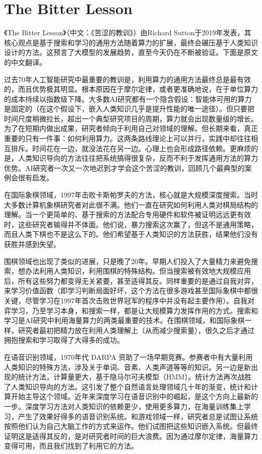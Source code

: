 \setcounter{section}{5}

\hypertarget{the-bitter-lesson}{%
\section{The Bitter Lesson}\label{the-bitter-lesson}}

《The Bitter Lesson》（中文：《苦涩的教训》）由Richard Sutton于2019年发表，其核心观点是基于搜索和学习的通用方法随着算力的扩展，最终会碾压基于人类知识设计的方法。这预言了大模型的发展趋势，直至今天仍在不断被验证。下面是原文的中文翻译。

过去70年人工智能研究中最重要的教训是，利用算力的通用方法最终总是最有效的，而且优势极其明显。根本原因在于摩尔定律，或者更准确地说，在于单位算力的成本持续以指数级下降。大多数AI研究都有一个隐含假设：智能体可用的算力是固定的（在这个假设下，嵌入人类知识几乎是提升性能的唯一途径）。但只要把时间尺度稍微拉长，超出一个典型研究项目的周期，算力就会出现数量级的增长。为了在短期内做出成果，研究者倾向于利用自己对领域的理解。但长期来看，真正重要的只有一件事：如何利用算力。这两条路线理论上可以并行，实践中却往往相互排斥。时间花在一边，就没法花在另一边。心理上也会形成路径依赖。更麻烦的是，人类知识导向的方法往往把系统搞得很复杂，反而不利于发挥通用方法的算力优势。AI研究者一次又一次地迟到才学会这个苦涩的教训，回顾几个最典型的案例会很有启发。

在国际象棋领域，1997年击败卡斯帕罗夫的方法，核心就是大规模深度搜索。当时大多数计算机象棋研究者对此很不满。他们一直在研究如何利用人类对棋局结构的理解。当一个更简单的、基于搜索的方法配合专用硬件和软件被证明远远更有效时，这些研究者输得并不体面。他们说，暴力搜索这次赢了，但这不是通用策略，而且人类下棋也不是这么下的。他们希望基于人类知识的方法获胜，结果他们没有获胜并感到失望。

围棋领域也出现了类似的进展，只是晚了20年。早期人们投入了大量精力来避免搜索，想办法利用人类知识，利用围棋的特殊结构。但当搜索被有效地大规模应用后，所有这些努力都变得无关紧要，甚至适得其反。同样重要的是通过自我对弈，来学习价值函数（即学习判断局面好坏，这个方法在很多游戏甚至国际象棋中都很关键，尽管学习在1997年首次击败世界冠军的程序中并没有起主要作用）。自我对弈学习，乃至学习本身，和搜索一样，都是让大规模算力发挥作用的方式。搜索和学习是AI研究中利用海量算力的两类最重要的技术。在围棋领域，和国际象棋一样，研究者最初把精力放在利用人类理解上（从而减少搜索量），很久之后才通过拥抱搜索和学习取得了大得多的成功。

在语音识别领域，1970年代 DARPA 资助了一场早期竞赛。参赛者中有大量利用人类知识的特殊方法，涉及关于单词、音素、人类声道等等的知识。另一边是新出现的统计方法，计算量更大，基于隐马尔可夫模型（HMM）。统计方法再次战胜了人类知识导向的方法。这引发了整个自然语言处理领域几十年的渐变，统计和计算开始主导这个领域。近年来深度学习在语音识别中的崛起，是这个方向上最新的一步。深度学习方法对人类知识的依赖更少，使用更多算力，在海量训练集上学习，产生了效果好得多的语音识别系统。和游戏领域一样，研究者总是试图让系统按照他们认为自己大脑工作的方式来运作。他们试图把这些知识嵌入系统。但最终证明这是适得其反的，是对研究者时间的巨大浪费。因为通过摩尔定律，海量算力变得可用，而且我们找到了利用它的方法。

